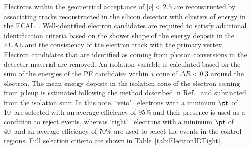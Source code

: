 Electrons within the geometrical acceptance of $|\eta| < 2.5$
are reconstructed by associating tracks reconstructed
in the silicon detector with clusters of energy in the ECAL~\cite{Khachatryan:2015hwa}.
Well-identified electron candidates are required to satisfy
additional identification criteria based on the shower
shape of the energy deposit in the ECAL and the consistency of the
electron track with the primary vertex~\cite{TRK-11-001}. Electron candidates
that are identified as coming from photon conversions in
the detector material are removed. An isolation variable is calculated based on the sum of the energies of the PF candidates 
within a cone of $\Delta R < 0.3$ around the electron. The mean energy deposit in the isolation cone of the electron coming 
from pileup is estimated following the method described in Ref.~\cite{Khachatryan:2015hwa} and subtracted from the isolation sum. 
In this note, `veto'~\cite{CMS-EGM-TWIKI-ELEID} electrons with a minimum $\pt$ of 10~\GeV are selected with an average efficiency 
of 95\% and their presence is used as a condition to reject events, whereas `tight'~\cite{CMS-EGM-TWIKI-ELEID} electrons with a 
minimum $\pt$ of 40~\GeV and an average efficiency of 70\% are used to select the events
in the control regions. Full selection criteria are shown in Table~\ref{tab:ElectronIDTight}.


